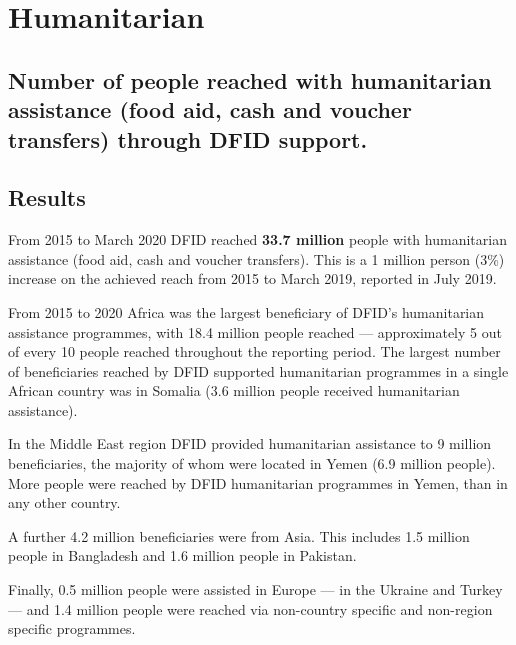 \chapter{Humanitarian}

\section*{Number of people reached with humanitarian assistance (food aid, cash and voucher transfers) through DFID support.}

\thispagestyle{empty}



\section{Results}
From 2015 to March 2020 DFID reached \textbf{
33.7 million
} people with humanitarian assistance (food aid, cash and voucher transfers). %
This is a 1 million person (3\%) increase on the achieved reach from 2015 to March 2019, reported in July 2019. %

From 2015 to 2020 Africa was the largest beneficiary of DFID's humanitarian assistance programmes, with
18.4 million
people reached --- approximately 5 out of every 10 people reached throughout the reporting period. %
The largest number of beneficiaries reached by DFID supported humanitarian programmes in a single African country was in Somalia (3.6 million
people received humanitarian assistance). %

In the Middle East region DFID provided humanitarian assistance to
9
million beneficiaries, the majority of whom were located in Yemen (6.9
million people). %
More people were reached by DFID humanitarian programmes in Yemen, than in any other country. %

A further
4.2
million beneficiaries were from Asia. %
This includes
1.5
million people in Bangladesh and
1.6
million people in Pakistan. %

Finally,
0.5 million
people were assisted in Europe --- in the Ukraine and Turkey --- and
1.4
million people were reached via non-country specific and non-region specific programmes. %

